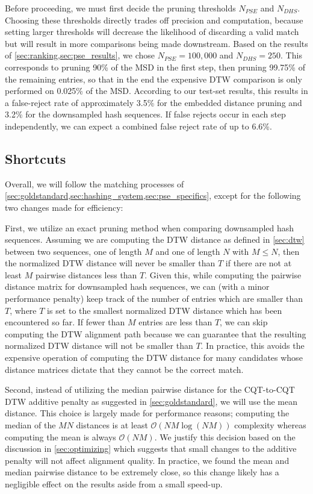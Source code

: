 Before proceeding, we must first decide the pruning thresholds $N_{PSE}$ and $N_{DHS}$.
Choosing these thresholds directly trades off precision and computation, because setting larger thresholds will decrease the likelihood of discarding a valid match but will result in more comparisons being made downstream.
Based on the results of \cref{sec:ranking,sec:pse_results}, we chose $N_{PSE} = 100,000$ and $N_{DHS} = 250$.
This corresponds to pruning 90\% of the MSD in the first step, then pruning 99.75\% of the remaining entries, so that in the end the expensive DTW comparison is only performed on 0.025\% of the MSD.
According to our test-set results, this results in a false-reject rate of approximately 3.5\% for the embedded distance pruning and 3.2\% for the downsampled hash sequences.
If false rejects occur in each step independently, we can expect a combined false reject rate of up to 6.6\%.

\subsection{Shortcuts}

Overall, we will follow the matching processes of \cref{sec:goldstandard,sec:hashing_system,sec:pse_specifics}, except for the following two changes made for efficiency:

First, we utilize an exact pruning method when comparing downsampled hash sequences.
Assuming we are computing the DTW distance as defined in \cref{sec:dtw} between two sequences, one of length $M$ and one of length $N$ with $M \le N$, then the normalized DTW distance will never be smaller than $T$ if there are not at least $M$ pairwise distances less than $T$.
Given this, while computing the pairwise distance matrix for downsampled hash sequences, we can (with a minor performance penalty) keep track of the number of entries which are smaller than $T$, where $T$ is set to the smallest normalized DTW distance which has been encountered so far.
If fewer than $M$ entries are less than $T$, we can skip computing the DTW alignment path because we can guarantee that the resulting normalized DTW distance will not be smaller than $T$.
In practice, this avoids the expensive operation of computing the DTW distance for many candidates whose distance matrices dictate that they cannot be the correct match.

Second, instead of utilizing the median pairwise distance for the CQT-to-CQT DTW additive penalty as suggested in \cref{sec:goldstandard}, we will use the mean distance.
This choice is largely made for performance reasons; computing the median of the $MN$ distances is at least $\mathcal{O}( NM\log(NM) )$ complexity whereas computing the mean is always $\mathcal{O}(NM)$.
We justify this decision based on the discussion in \cref{sec:optimizing} which suggests that small changes to the additive penalty will not affect alignment quality.
In practice, we found the mean and median pairwise distance to be extremely close, so this change likely has a negligible effect on the results aside from a small speed-up.

